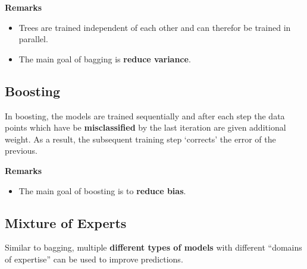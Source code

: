\textbf{Remarks}
\begin{itemize}
    \item Trees are trained independent of each other and can therefor be trained in parallel.
    \item The main goal of bagging is \textbf{reduce variance}.
\end{itemize}

\subsection{Boosting}
In boosting, the models are trained sequentially and after each step the data points which have be \textbf{misclassified} by the last iteration are given additional weight.
As a result, the subsequent training step `corrects' the error of the previous.

\newpar{}

\textbf{Remarks}
\begin{itemize}
    \item The main goal of boosting is to \textbf{reduce bias}.
\end{itemize}

\subsection{Mixture of Experts}
Similar to bagging, multiple \textbf{different types of models} with different ``domains of expertise'' can be used to improve predictions.